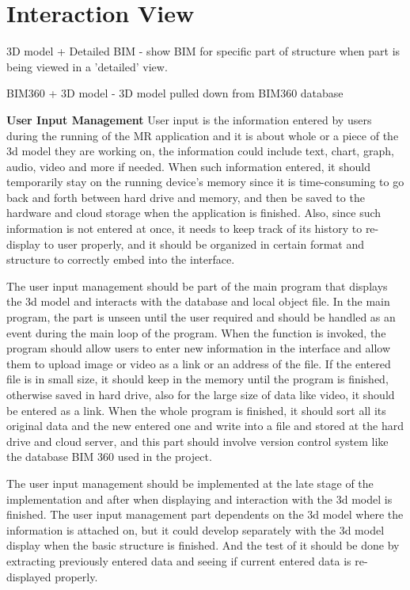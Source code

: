 \documentclass[onecolumn, draftclsnofoot,10pt, compsoc]{IEEEtran}
\begin{document}
\section{Interaction View}
3D model + Detailed BIM - show BIM for specific part of structure when part is being viewed in a 'detailed' view.

BIM360 + 3D model - 3D model pulled down from BIM360 database

\vspace{1cm}
\textbf{User Input Management}
User input is the information entered by users during the running of the MR application and it is about whole or a piece of the 3d model they are working on, the information could include text, chart, graph, audio, video and more if needed. When such information entered, it should temporarily stay on the running device’s memory since it is time-consuming to go back and forth between hard drive and memory, and then be saved to the hardware and cloud storage when the application is finished. Also, since such information is not entered at once, it needs to keep track of its history to re-display to user properly, and it should be organized in certain format and structure to correctly embed into the interface.\par
The user input management should be part of the main program that displays the 3d model and interacts with the database and local object file. In the main program, the part is unseen until the user required and should be handled as an event during the main loop of the program. When the function is invoked, the program should allow users to enter new information in the interface and allow them to upload image or video as a link or an address of the file. If the entered file is in small size, it should keep in the memory until the program is finished, otherwise saved in hard drive, also for the large size of data like video, it should be entered as a link. When the whole program is finished, it should sort all its original data and the new entered one and write into a file and stored at the hard drive and cloud server, and this part should involve version control system like the database BIM 360 used in the project.\par
The user input management should be implemented at the late stage of the implementation and after when displaying and interaction with the 3d model is finished. The user input management part dependents on the 3d model where the information is attached on, but it could develop separately with the 3d model display when the basic structure is finished. And the test of it should be done by extracting previously entered data and seeing if current entered data is re-displayed properly.
\end{document}
